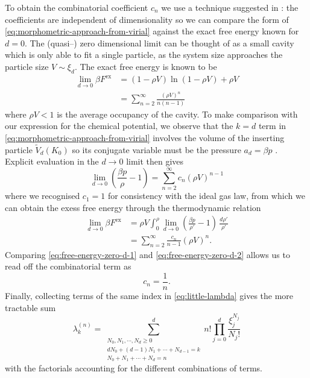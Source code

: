 \documentclass[11pt,twoside]{report}
\begin{document}
To obtain the combinatorial coefficient $c_n$ we use a technique suggested in \cite{MarechalPRE2014}: the coefficients are independent of dimensionality so we can compare the form of \eqref{eq:morphometric-approach-from-virial} against the exact free energy known for $d=0$.
The (quasi--) zero dimensional limit can be thought of as a small cavity which is only able to fit a single particle, as the system size approaches the particle size $V \sim \xi_d$.
The exact free energy is known to be \cite{RosenfeldJPCM1996,MarechalPRE2014}
\begin{equation}\label{eq:free-energy-zero-d-1}
  \begin{split}
    \lim_{d \to 0}
    \beta F^\mathrm{ex}
    &=
    (1 - \rho V) \ln{(1 - \rho V)} + \rho V
    \\ &=
    \sum_{n=2}^\infty \frac{(\rho V)^n}{n(n-1)}
  \end{split}
\end{equation}
where $\rho V < 1$ is the average occupancy of the cavity.
To make comparison with our expression for the chemical potential, we observe that the $k=d$ term in \eqref{eq:morphometric-approach-from-virial} involves the volume of the inserting particle $\widetilde{V}_d(K_0)$ so its conjugate variable must be the pressure $a_d = \beta p$ \cite{ReissJCP1959}.
Explicit evaluation in the $d \to 0$ limit then gives
\begin{equation*}
  \lim_{d \to 0}
  \left(
  \frac{\beta p}{\rho} - 1
  \right)
  =
  \sum_{n=2}^\infty c_n (\rho V)^{n-1}
\end{equation*}
where we recognised $c_1 = 1$ for consistency with the ideal gas law, from which we can obtain the exess free energy through the thermodynamic relation
\begin{equation}\label{eq:free-energy-zero-d-2}
  \begin{split}
    \lim_{d \to 0}
    \beta F^\mathrm{ex}
    &=
    \rho V \int_0^\rho
    \lim_{d \to 0}
    \left(
    \frac{\beta p}{\rho'} - 1
    \right)
    \, \frac{d\rho'}{\rho'}
    \\ &=
    \sum_{n=2}^\infty
    \frac{c_n}{n-1} (\rho V)^n.
  \end{split}
\end{equation}
Comparing \eqref{eq:free-energy-zero-d-1} and \eqref{eq:free-energy-zero-d-2} allows us to read off the combinatorial term as
\begin{equation}\label{eq:c-coefficient}
  c_n = \frac{1}{n}.
\end{equation}
Finally, collecting terms of the same index in \eqref{eq:little-lambda} gives the more tractable sum \cite{MarechalPRE2014}
\begin{equation}\label{eq:horrible-lambda-sum}
  \lambda_k^{(n)}
  =
  \sum_{\substack{
      N_0, N_1, \cdots, N_d \ge 0 \\
      d N_0 + (d-1)N_1 + \cdots + N_{d-1} = k \\
      N_0 + N_1 + \cdots + N_d = n}}^d
  n!
  \prod_{j=0}^d
  \frac{\xi_{j}^{N_j}}{N_j!}
\end{equation}
with the factorials accounting for the different combinations of terms.
\end{document}
